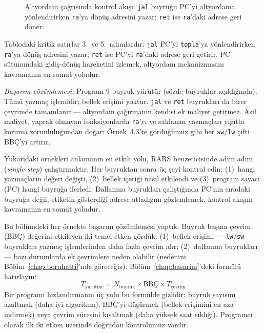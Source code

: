 \begin{ornek}[4.6]
\begin{figure}[H]
\caption[Altyordam çağrısında kontrol akışı]{Altyordam çağrısında kontrol akışı. \texttt{jal} buyruğu PC'yi altyordama yönlendirirken \texttt{ra}'ya dönüş adresini yazar; \texttt{ret} ise \texttt{ra}'daki adrese geri döner.}
\label{fig:altyordam-akis}
\end{figure}

Tablodaki kritik satırlar 3.~ve 5.~adımlardır: \texttt{jal} PC'yi \texttt{topla}'ya yönlendirirken \texttt{ra}'ya dönüş adresini yazar; \texttt{ret} ise PC'yi \texttt{ra}'daki adrese geri getirir. PC sütunundaki gidiş-dönüş hareketini izlemek, altyordam mekanizmasını kavramanın en somut yoludur.

\emph{Başarım çözümlemesi:} Program 9 buyruk yürütür (sözde buyruklar açıldığında). Tümü yazmaç işlemidir; bellek erişimi yoktur. \texttt{jal} ve \texttt{ret} buyrukları da birer çevrimde tamamlanır --- altyordam çağırmanın kendisi ek maliyet getirmez. Asıl maliyet, yaprak olmayan fonksiyonlarda \texttt{ra}'yı ve saklanan yazmaçları yığıtta koruma zorunluluğundan doğar: Örnek~4.3'te gördüğümüz gibi her \texttt{sw}/\texttt{lw} çifti BBÇ'yi artırır.
\end{ornek}

\begin{bilginot}
Yukarıdaki örnekleri anlamanın en etkili yolu, RARS benzeticisinde adım adım (\emph{single step}) çalıştırmaktır. Her buyruktan sonra üç şeyi kontrol edin: (1)~hangi yazmaçların değeri değişti, (2)~bellek içeriği nasıl etkilendi ve (3)~program sayacı (PC) hangi buyruğa ilerledi. Dallanma buyrukları çalıştığında PC'nin sıradaki buyruğa değil, etiketin gösterdiği adrese atladığını gözlemlemek, kontrol akışını kavramanın en somut yoludur.
\end{bilginot}

\begin{bilginot}
Bu bölümdeki her örnekte başarım çözümlemesi yaptık. Buyruk başına çevrim (BBÇ) değerini etkileyen iki temel etken gördük: (1)~bellek erişimi --- \texttt{lw}/\texttt{sw} buyrukları yazmaç işlemlerinden daha fazla çevrim alır; (2)~dallanma buyrukları --- bazı durumlarda ek çevrimlere neden olabilir (nedenini Bölüm~\ref{chap:boruhatti}'nde göreceğiz). Bölüm~\ref{chap:basarim}'deki formülü hatırlayın:
\[
T_{\text{yürütme}} = N_{\text{buyruk}} \times \text{BBÇ} \times T_{\text{çevrim}}
\]
Bir programı hızlandırmanın üç yolu bu formülde gizlidir: buyruk sayısını azaltmak (daha iyi algoritma), BBÇ'yi düşürmek (bellek erişimini en aza indirmek) veya çevrim süresini kısaltmak (daha yüksek saat sıklığı). Programcı olarak ilk iki etken üzerinde doğrudan kontrolümüz vardır.
\end{bilginot}

